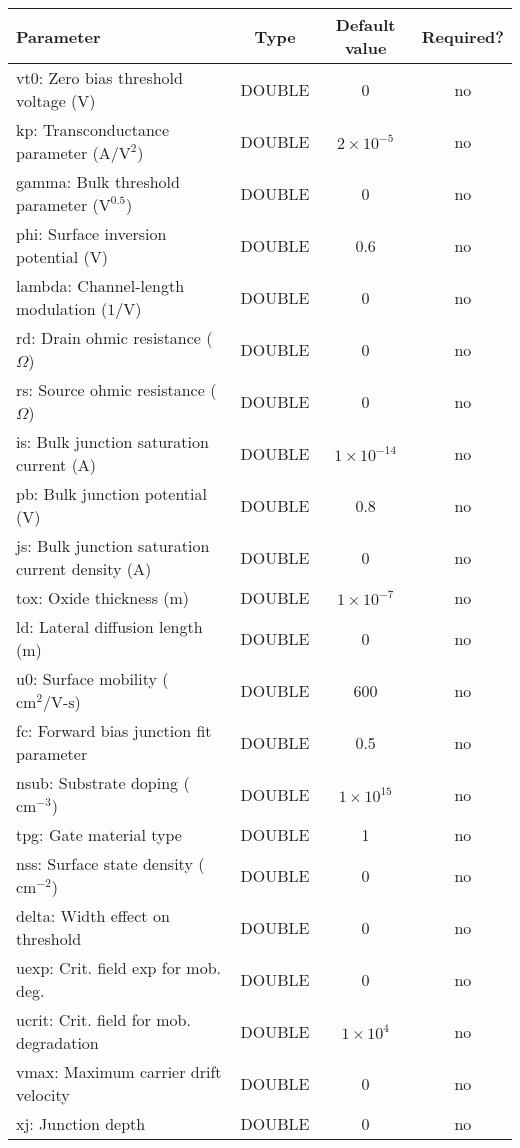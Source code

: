 \documentclass{article}
\begin{document}
\begin{table}[H]
\begin{tabular}{|l|c|c|c|}
\hline
Parameter&Type&Default value&Required?\\
\hline
vt0: Zero bias threshold voltage (V)& DOUBLE & 0 & no\\
\hline
kp: Transconductance parameter ($\textrm{A}/\textrm{V}^2$) & DOUBLE & $2\times10^{-5}$ & no\\
\hline
gamma: Bulk threshold parameter ($\textrm{V}^{0.5}$) & DOUBLE & 0 & no\\
\hline
phi: Surface inversion potential (V) & DOUBLE & 0.6 & no\\
\hline
lambda: Channel-length modulation ($\textrm{1/V}$) & DOUBLE & 0 & no\\
\hline
rd: Drain ohmic resistance ($\Omega$) & DOUBLE & 0 & no\\
\hline
rs: Source ohmic resistance ($\Omega$) & DOUBLE & 0 & no\\
\hline
is: Bulk junction saturation current (A) & DOUBLE & $1\times10^{-14}$ & no\\
\hline
pb: Bulk junction potential (V) & DOUBLE & 0.8 & no\\
\hline
js: Bulk junction saturation current density (A) & DOUBLE &
0 & no\\
\hline
tox: Oxide thickness (m)& DOUBLE & $1\times10^{-7}$ & no\\
\hline
ld: Lateral diffusion length (m) & DOUBLE & 0 & no\\
\hline
u0: Surface mobility ($\textrm{cm}^2/\textrm{V-s}$)& DOUBLE & 600 & no\\
\hline
fc: Forward bias junction fit parameter & DOUBLE &  0.5 & no\\
\hline
nsub: Substrate doping ($\textrm{cm}^{-3}$) & DOUBLE & $1\times10^{15}$ & no\\
\hline
tpg: Gate material type & DOUBLE & 1 & no\\
\hline
nss: Surface state density ($\textrm{cm}^{-2}$) & DOUBLE & 0 & no\\
\hline
delta: Width effect on threshold & DOUBLE & 0 & no\\
\hline
uexp: Crit. field exp for mob. deg. & DOUBLE & 0 & no\\
\hline
ucrit: Crit. field for mob. degradation & DOUBLE &
$1\times10^{4}$ & no\\
\hline
vmax: Maximum carrier drift velocity & DOUBLE & 0 & no\\
\hline
xj: Junction depth & DOUBLE & 0 & no\\

\end{tabular}
\end{table}
\end{document}
